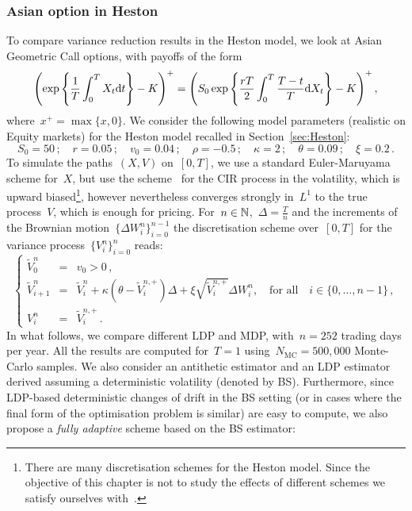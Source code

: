 \subsubsection{Asian option in Heston}
To compare variance reduction results in the Heston model, we look at Asian Geometric Call options, with payoffs of the form
\[
\left(\exp\left\{\frac{1}{T}\int_0^T X_t\mathrm{d} t\right\} - K\right)^+ = \left(S_0 \exp\left \{\frac{rT}{2}\int_0^T\frac{T-t}{T}\mathrm{d} X_t\right \} - K\right)^+,
\]
where~$x^+ = \max\{x,0\}$. 
We consider the following model parameters 
(realistic on Equity markets)
for the Heston model recalled in Section~\ref{sec:Heston}:
$$
S_0 = 50\,; \quad
r = 0.05\,; \quad
v_0 = 0.04\,; \quad
\rho = -0.5\,; \quad 
\kappa = 2\,; \quad
\theta = 0.09\,; \quad 
\xi = 0.2\,.
$$
To simulate the paths~$(X,V)$ on~$[0,T]$, 
we use a standard Euler-Maruyama scheme for~$X$, but use the scheme~\cite{Lord2009AModels} for the CIR process in the volatility, 
which is upward biased\footnote{There are many discretisation schemes for the Heston model. 
Since the objective of this chapter is not to study the effects of different schemes we satisfy ourselves with~\cite{Lord2009AModels}.}, however nevertheless converges strongly in~$L^1$ to the true process~$V$, which is enough for pricing. For~$n\in\mathbb{N}$,~$\Delta =\frac{T}{n}$ and the increments of the Brownian motion~$\{\Delta W_{i}^n\}_{i=0}^{n-1}$ the discretisation scheme over~$[0,T]$ for the variance process~$\{V_i^n\}_{i=0}^n$ reads:
\begin{equation*}
\left\{
\begin{array}{rcl}
\widetilde{V}_{0}^n & = & v_0>0\,, \\
\widetilde{V}_{i+1}^n & = & \widetilde{V}_{i}^n + \kappa \left(\theta - \widetilde{V}_{i}^{n,+}\right)\Delta + \xi \sqrt{\widetilde{V}_{i}^{n,+}}\Delta W_{i}^n, \quad \text{for all} \quad i\in\{0,\dots,n-1\}\,, \\
V_{i}^n & = & \widetilde{V}_{i}^{n,+}\,.
\end{array}
\right.
\end{equation*}
In what follows, we compare different LDP and MDP, with~$n=252$ trading days per year. 
All the results are computed for~$T=1$ using~$N_{\text{MC}}=500,000$ Monte-Carlo samples. 
We also consider an antithetic estimator and an LDP estimator derived assuming a deterministic volatility (denoted by BS).
Furthermore, since LDP-based deterministic changes of drift in the BS setting (or in cases where the final form of the optimisation problem is similar) are easy to compute, we also propose a \textit{fully adaptive} scheme based on the BS estimator: 
